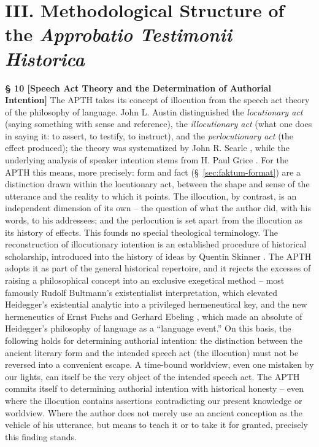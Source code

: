 \documentclass[11pt,a4paper]{article}
\makeatletter
\newcommand{\apth}{{\apthfont APTH}\hspace{0.15em}\xspace}
\newcommand{\apthsec}[3]{%
  \phantomsection%
  \def\@currentlabel{#1}%
  \label{sec:#3}%
  \textbf{§ #1 [#2]}%
}
\makeatother
\begin{document}
\section*{III. Methodological Structure of the \textit{Approbatio Testimonii Historica}}

\apthsec{10}{Speech Act Theory and the Determination of Authorial Intention}{sprechakttheorie} The \apth takes its concept of illocution from the speech act theory of the philosophy of language. John L. Austin \citeyearpar{austin1962} distinguished the \textit{locutionary act} (saying something with sense and reference), the \textit{illocutionary act} (what one does in saying it: to assert, to testify, to instruct), and the \textit{perlocutionary act} (the effect produced); the theory was systematized by John R. Searle \citeyearpar{searle1969}, while the underlying analysis of speaker intention stems from H. Paul Grice \citeyearpar{grice1957}. For the \apth this means, more precisely: form and fact (§~\ref{sec:faktum-format}) are a distinction drawn within the locutionary act, between the shape and sense of the utterance and the reality to which it points. The illocution, by contrast, is an independent dimension of its own -- the question of what the author did, with his words, to his addressees; and the perlocution is set apart from the illocution as its history of effects. This founds no special theological terminology. The reconstruction of illocutionary intention is an established procedure of historical scholarship, introduced into the history of ideas by Quentin Skinner \citeyearpar{skinner1969}. The \apth adopts it as part of the general historical repertoire, and it rejects the excesses of raising a philosophical concept into an exclusive exegetical method -- most famously Rudolf Bultmann's \citeyearpar{bultmann1941} existentialist interpretation, which elevated Heidegger's existential analytic into a privileged hermeneutical key, and the new hermeneutics of Ernst Fuchs \citeyearpar{fuchs1959} and Gerhard Ebeling \citeyearpar{ebeling1967}, which made an absolute of Heidegger's philosophy of language as a ``language event.'' On this basis, the following holds for determining authorial intention: the distinction between the ancient literary form and the intended speech act (the illocution) must not be reversed into a convenient escape. A time-bound worldview, even one mistaken by our lights, can itself be the very object of the intended speech act. The \apth commits itself to determining authorial intention with historical honesty -- even where the illocution contains assertions contradicting our present knowledge or worldview. Where the author does not merely use an ancient conception as the vehicle of his utterance, but means to teach it or to take it for granted, precisely this finding stands.
\end{document}
